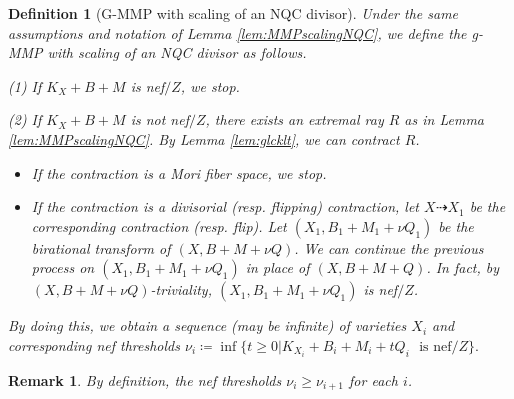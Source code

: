 \documentclass[11pt]{amsart}
\newtheorem{definition}[theorem]{Definition}
\newtheorem{remark}[theorem]{Remark}
\begin{document}
\begin{definition}[G-MMP with scaling of an NQC divisor]\label{defn:MMPsP} Under the same assumptions and notation of Lemma \ref{lem:MMPscalingNQC}, we define the g-MMP with scaling of an NQC divisor as follows.

(1) If $K_X+B+M$ is nef$/Z$, we stop.

(2) If $K_X+B+M$ is not nef$/Z$, there exists an extremal ray $R$ as in Lemma \ref{lem:MMPscalingNQC}. By Lemma \ref{lem:glcklt}, we can contract $R$. 
\begin{itemize}
\item If the contraction is a Mori fiber space, we stop. 
\item If the contraction is a divisorial (resp. flipping) contraction, let  $X\dashrightarrow X_1$ be the corresponding contraction (resp. flip). Let $(X_1,B_1+M_1+\nu Q_1)$ be the birational transform of $(X, B+M+\nu Q)$. We can continue the previous process on $(X_1,B_1+M_1+\nu Q_1)$ in place of $(X, B+M+Q)$. In fact, by $(X, B+M+\nu Q)$-triviality,  $(X_1,B_1+M_1+\nu Q_1)$ is nef$/Z$.\end{itemize}

By doing this, we obtain a sequence (may be infinite) of varieties $X_i$ and corresponding nef thresholds $\nu_i\coloneqq \inf\{t\ge0| K_{X_i}+B_i+M_i+tQ_i \text{~ is nef}/Z\}.$
\end{definition}

\begin{remark}\label{rk: decreasing sequence}
By definition, the nef thresholds $\nu_i \geq \nu_{i+1}$ for each $i$.
\end{remark}
\end{document}
